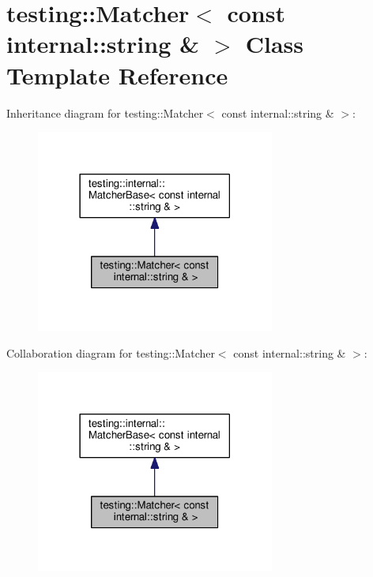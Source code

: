 \hypertarget{classtesting_1_1Matcher_3_01const_01internal_1_1string_01_6_01_4}{}\section{testing\+:\+:Matcher$<$ const internal\+:\+:string \& $>$ Class Template Reference}
\label{classtesting_1_1Matcher_3_01const_01internal_1_1string_01_6_01_4}


Inheritance diagram for testing\+:\+:Matcher$<$ const internal\+:\+:string \& $>$\+:\nopagebreak
\begin{figure}[H]
\begin{center}
\leavevmode
\includegraphics[width=222pt]{classtesting_1_1Matcher_3_01const_01internal_1_1string_01_6_01_4__inherit__graph}
\end{center}
\end{figure}


Collaboration diagram for testing\+:\+:Matcher$<$ const internal\+:\+:string \& $>$\+:\nopagebreak
\begin{figure}[H]
\begin{center}
\leavevmode
\includegraphics[width=222pt]{classtesting_1_1Matcher_3_01const_01internal_1_1string_01_6_01_4__coll__graph}
\end{center}
\end{figure}
